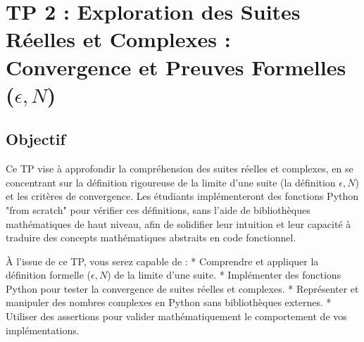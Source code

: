 \documentclass[a4paper,11pt]{report}
\begin{document}
\vspace{1cm}

\section*{TP 2 : Exploration des Suites Réelles et Complexes : Convergence et Preuves Formelles ($\epsilon, N$)}
\subsection*{Objectif}
Ce TP vise à approfondir la compréhension des suites réelles et complexes, en se concentrant sur la définition rigoureuse de la limite d'une suite (la définition $\epsilon, N$) et les critères de convergence. Les étudiants implémenteront des fonctions Python "from scratch" pour vérifier ces définitions, sans l'aide de bibliothèques mathématiques de haut niveau, afin de solidifier leur intuition et leur capacité à traduire des concepts mathématiques abstraits en code fonctionnel.

À l'issue de ce TP, vous serez capable de :
*   Comprendre et appliquer la définition formelle ($\epsilon, N$) de la limite d'une suite.
*   Implémenter des fonctions Python pour tester la convergence de suites réelles et complexes.
*   Représenter et manipuler des nombres complexes en Python sans bibliothèques externes.
*   Utiliser des assertions pour valider mathématiquement le comportement de vos implémentations.
\end{document}
